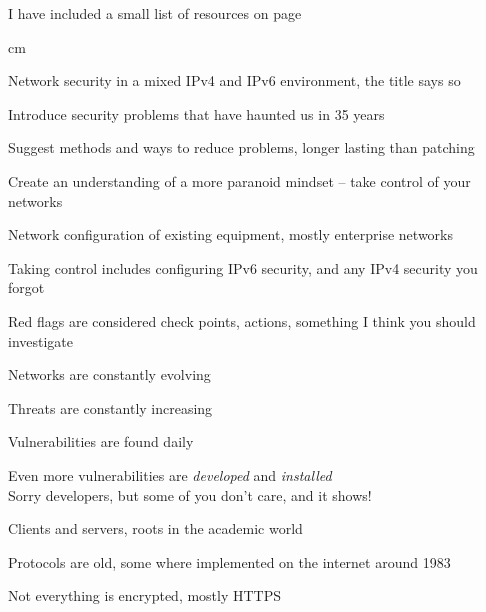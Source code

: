 \documentclass[Screen16to9,17pt]{foils}
\begin{document}
I have included a small list of resources on page \pageref{resources}

 cm


\begin{list2}
\item Network security in a mixed IPv4 and IPv6 environment, the title says so \smiley
\item Introduce security problems that have haunted us in 35 years
\item Suggest methods and ways to reduce problems, longer lasting than patching
\item Create an understanding of a more paranoid mindset -- take control of your networks
\item Network configuration of existing equipment, mostly enterprise networks
\item Taking control includes configuring IPv6 security, and any IPv4 security you forgot {\myalert}
\end{list2}
{\small Red flags are considered check points, actions, something I think you should investigate}



\begin{list2}
\item Networks are constantly evolving
\item Threats are constantly increasing
\item Vulnerabilities are found daily
\item Even more vulnerabilities are \emph{developed} and \emph{installed}\\
Sorry developers, but some of you don't care, and it shows!
\end{list2}




\begin{list1}
\item Clients and servers, roots in the academic world
\item Protocols are old, some where implemented on the internet around 1983
\item Not everything is encrypted, mostly HTTPS
\end{list1}
\end{document}
